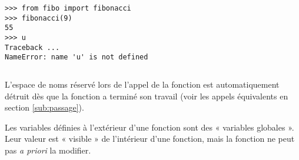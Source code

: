 \noindent\mbox{}\hspace*{1cm}\begin{py}{6cm}
\begin{verbatim}
>>> from fibo import fibonacci
>>> fibonacci(9)
55
>>> u
Traceback ...
NameError: name 'u' is not defined
\end{verbatim}
\end{py}
\hfill
\begin{py}{6cm}
\begin{verbatim}

\end{verbatim}
\end{py}
\hspace*{1cm}\mbox{}\vspace*{2mm}

\noindent L'espace de noms réservé lors de l'appel de la fonction est
automatiquement détruit dès que la fonction a terminé son travail (voir les appels
équivalents en section \ref{sub:passage}).

Les variables définies à l'extérieur d'une fonction sont des « variables globales ».
Leur valeur est « visible » de l'intérieur d'une fonction, mais la fonction ne peut pas 
{\em a priori} la modifier.

